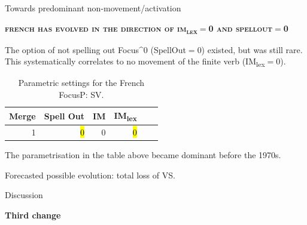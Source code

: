 \documentclass[lesson_slides]{subfiles}
\begin{document}
\begin{frame}[c]{Towards predominant non-movement/activation}

    \textbf{\textsc{french has evolved in the direction of im\textsubscript{lex}$=$0 and spellout$=$0}}

\noindent The option of not spelling out Focus^0 (SpellOut$=$0) existed, but was still rare. This systematically correlates to no movement of the finite verb (IM\textsubscript{lex}$=$0).

\begin{table}[H]
    \centering
    \begin{tabular}{|r|r|r|r|r|r|}
    \hline
    Merge & Spell Out & IM & IM\textsubscript{lex} \\
    \hline
    1 & \hl{0} & 0 & \hl{0} \\
    \hline
    \end{tabular}
    \caption{\label{tab:samp}Parametric settings for the French FocusP: SV.}
\end{table}

\noindent The parametrisation in the table above became dominant before the 1970s. \pause

\noindent Forecasted possible evolution: total loss of VS.
  
\end{frame}
\begin{frame}[c]{Discussion}
    
\begin{center}
    \textbf{Third change}
\end{center}
  
\end{frame}
\end{document}
